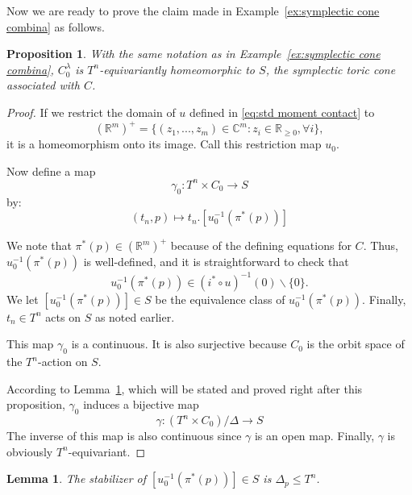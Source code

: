 \documentclass[12pt]{amsart}
\newtheorem{lemma}[theorem]{Lemma}
\newtheorem{proposition}[theorem]{Proposition}
\theoremstyle{definition}
\numberwithin{equation}{section}
\begin{document}
Now we are ready to prove the claim made in
Example~\ref{ex:symplectic cone combina} as follows.
\begin{proposition}
With the same notation as in Example~\ref{ex:symplectic cone
combina}, $C_{0}^{\lambda}$ is $T^n$-equivariantly homeomorphic to
$S$, the symplectic toric cone associated with $C$.
\end{proposition}
\begin{proof}

If we restrict the domain of $u$ defined in \eqref{eq:std moment
contact} to
\begin{equation}({{\mathbb{R}}}^m)^{+}=\{(z_{1},...,z_{m})\in {{\mathbb{C}}}^m: z_{i}\in {{\mathbb{R}}}_{\geq
0},\forall i\},\end{equation} it is a homeomorphism onto its image.
Call this restriction map $u_{0}$.

 Now define a map \begin{equation}\gamma_{0}: T^n\times C_{0}\rightarrow
 S\end{equation} by:
 \[(t_{n},p)\mapsto t_{n}.[u_{0}^{-1}(\pi^{*}(p))]\]

We note that $\pi^{*}(p)\in ({{\mathbb{R}}}^m)^{+}$ because of the defining
equations for $C$. Thus, $u_{0}^{-1}(\pi^{*}(p))$ is well-defined,
and it is straightforward to check that
\begin{equation*}u_{0}^{-1}(\pi^{*}(p))\in (i^{*}\circ u)^{-1}(0)\backslash
\{0\}.\end{equation*} We let $[u_{0}^{-1}(\pi^{*}(p))]\in S$ be the
equivalence class of $u_{0}^{-1}(\pi^{*}(p))$. Finally, $t_{n}\in
T^n$ acts on $S$ as noted earlier.

 This map $\gamma_{0}$ is a continuous. It is also surjective because $C_{0}$ is the orbit space of the $T^n$-action on
 $S$.

 According to Lemma~\ref{lemma:stabilizer}, which will be stated and proved right after this proposition, $\gamma_{0}$ induces a bijective map
 \begin{equation}\label{eq:gamma}
 \gamma: (T^n\times C_{0})/\Delta\rightarrow
 S\end{equation}
 The inverse of this map is also continuous since $\gamma$ is an
 open map. Finally, $\gamma$ is obviously $T^n$-equivariant.
\end{proof}

\begin{lemma}\label{lemma:stabilizer}
 The stabilizer of $[u_{0}^{-1}(\pi^{*}(p))]\in S$ is
 $\Delta_{p}\leq T^n$.
 \end{lemma}
\end{document}
